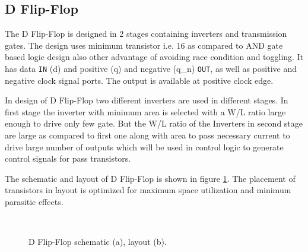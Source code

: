 \documentclass[parskip,oneside,colorbacktitle,10pt,accentcolor=tud1b]{tudreport}
\begin{document}
{\subsection{D Flip-Flop}

The D Flip-Flop is designed in 2 stages containing inverters and transmission gates. The design uses minimum transistor i.e. 16 as compared to AND gate based logic design also other advantage of avoiding race condition and toggling. It has data \texttt{IN} (d) and positive (q) and negative (q\_n) \texttt{OUT}, as well as positive and negative clock signal ports. The output is available at positive clock edge. 

In design of D Flip-Flop two different inverters are used in different stages. In first stage the inverter with minimum area is selected with a W/L ratio large enough to drive only few gate. But the W/L ratio of the Inverters in second stage are large as compared to first one along with area to pass necessary current to drive large number of outputs which will be used in control logic to generate control signals for pass transistors. 

The schematic and layout of D Flip-Flop is shown in figure \ref{fig:dff}. The placement of transistors in layout is optimized for maximum space utilization and minimum parasitic effects.

\begin{figure}[H]
     \begin{center}
        \\
        \caption{D Flip-Flop schematic (a), layout (b).}
        \label{fig:dff}
    \end{center}
\end{figure}

}
\end{document}
